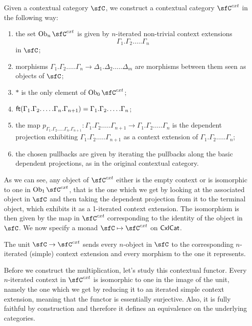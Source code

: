 \begin{construction}\cite[21]{Lum10}
  Given a contextual category $\sfC$, we construct a contextual category
  $\sfC^{cxt}$ in the following way:
  \begin{enumerate}
    \item the set $\Ob_n\sfC^{cxt}$ is given by $n$-iterated non-trivial context
      extensions
      \[\Gamma_1.\Gamma_2.\ldots.\Gamma_n\]
      in $\sfC$;
    \item morphisms
      $\Gamma_1.\Gamma_2.\ldots.\Gamma_n\rightarrow\Delta_1.\Delta_2.\ldots.\Delta_m$
      are morphisms between them seen as objects of $\sfC$;
    \item $*$ is the only element of $\Ob_0\sfC^{cxt}$;
    \item
      $\operatorname{\mathsf{ft}}(\Gamma_1.\Gamma_2.\ldots.\Gamma_n.\Gamma_{n+1})=\Gamma_1.\Gamma_2.\ldots.\Gamma_n$;
    \item the map $p_{\Gamma_1.\Gamma_2.\ldots.\Gamma_n.\Gamma_{n+1}}\colon
      \Gamma_1.\Gamma_2.\ldots.\Gamma_{n+1}\rightarrow
      \Gamma_1.\Gamma_2.\ldots.\Gamma_n$ is the dependent projection exhibiting
      $\Gamma_1.\Gamma_2.\ldots.\Gamma_{n+1}$ as a context extension of
      $\Gamma_1.\Gamma_2.\ldots.\Gamma_n$;
    \item the chosen pullbacks are given by iterating the pullbacks along the
      basic dependent projections, as in the original contextual category.
  \end{enumerate}

  As we can see, any object of $\sfC^{cxt}$ either is the empty context or is
  isomorphic to one in
  $\Ob_1\sfC^{cxt}$, that is the one which we get by looking at the associated object
  in $\sfC$ and then taking the dependent projection from it to the terminal
  object, which exhibits it as a 1-iterated context extension. The isomorphism
  is then given by the map in $\sfC^{cxt}$ corresponding to the identity of the
  object in $\sfC$. We now specify a monad $\sfC\mapsto\sfC^{cxt}$ on $\operatorname{\mathsf{CxlCat}}$.

  The unit $\sfC\rightarrow\sfC^{cxt}$ sends every $n$-object in $\sfC$ to
  the corresponding $n$-iterated (simple) context extension and every morphism
  to the one it represents.

  Before we construct the multiplication, let's study this contextual functor.
  Every $n$-iterated
  context in $\sfC^{cxt}$ is isomorphic to one in the image of the unit, namely
  the one which we get by reducing it to an iterated simple context extension,
  meaning that the functor is essentially surjective. Also, it is fully faithful
  by construction and therefore it defines an equivalence on the underlying
  categories.


\end{construction}
